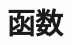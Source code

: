 \documentclass[../main.tex]{subfiles} %
\begin{document}
\clearpage
\chapter{函数}
    
    
    
\end{document}
